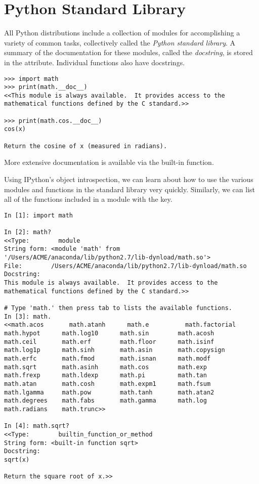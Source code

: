 \section*{Python Standard Library}

All Python distributions include a collection of modules for accomplishing a variety of common tasks, collectively called the \emph{Python standard library}.
A summary of the documentation for these modules, called the \emph{docstring}, is stored in the  attribute.
Individual functions also have docstrings.

\begin{lstlisting}
>>> import math
>>> print(math.__doc__)
<<This module is always available.  It provides access to the
mathematical functions defined by the C standard.>>

>>> print(math.cos.__doc__)
cos(x)

Return the cosine of x (measured in radians).
\end{lstlisting}

More extensive documentation is available via the  built-in function.

Using IPython's object introspection, we can learn about how to use the various modules and functions in the standard library very quickly.
Similarly, we can list all of the functions included in a module with the  key.

\begin{lstlisting}
In [1]: import math

In [2]: math?
<<Type:        module
String form: <module 'math' from '/Users/ACME/anaconda/lib/python2.7/lib-dynload/math.so'>
File:        /Users/ACME/anaconda/lib/python2.7/lib-dynload/math.so
Docstring:
This module is always available.  It provides access to the
mathematical functions defined by the C standard.>>

# Type 'math.' then press tab to lists the available functions.
In [3]: math.
<<math.acos       math.atanh      math.e          math.factorial  
math.hypot      math.log10      math.sin        math.acosh      
math.ceil       math.erf        math.floor      math.isinf      
math.log1p      math.sinh       math.asin       math.copysign   
math.erfc       math.fmod       math.isnan      math.modf       
math.sqrt       math.asinh      math.cos        math.exp        
math.frexp      math.ldexp      math.pi         math.tan        
math.atan       math.cosh       math.expm1      math.fsum       
math.lgamma     math.pow        math.tanh       math.atan2      
math.degrees    math.fabs       math.gamma      math.log        
math.radians    math.trunc>>

In [4]: math.sqrt?
<<Type:        builtin_function_or_method
String form: <built-in function sqrt>
Docstring:
sqrt(x)

Return the square root of x.>>
\end{lstlisting}

